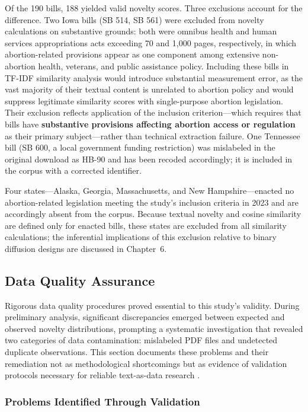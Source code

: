 Of the 190 bills, 188 yielded valid novelty scores. Three exclusions account for the difference. Two Iowa bills (SB 514, SB 561) were excluded from novelty calculations on substantive grounds: both were omnibus health and human services appropriations acts exceeding 70 and 1,000 pages, respectively, in which abortion-related provisions appear as one component among extensive non-abortion health, veterans, and public assistance policy. Including these bills in TF-IDF similarity analysis would introduce substantial measurement error, as the vast majority of their textual content is unrelated to abortion policy and would suppress legitimate similarity scores with single-purpose abortion legislation. Their exclusion reflects application of the inclusion criterion---which requires that bills have \textbf{substantive provisions affecting abortion access or regulation} as their primary subject---rather than technical extraction failure. One Tennessee bill (SB 600, a local government funding restriction) was mislabeled in the original download as HB-90 and has been recoded accordingly; it is included in the corpus with a corrected identifier.

Four states---Alaska, Georgia, Massachusetts, and New Hampshire---enacted no abortion-related legislation meeting the study's inclusion criteria in 2023 and are accordingly absent from the corpus. Because textual novelty and cosine similarity are defined only for enacted bills, these states are excluded from all similarity calculations; the inferential implications of this exclusion relative to binary diffusion designs are discussed in Chapter~6.

\subsection{Data Quality Assurance}
\label{sec:dataquality}
Rigorous data quality procedures proved essential to this study's validity. During preliminary analysis, significant discrepancies emerged between expected and observed novelty distributions, prompting a systematic investigation that revealed two categories of data contamination: mislabeled PDF files and undetected duplicate observations. This section documents these problems and their remediation not as methodological shortcomings but as evidence of validation protocols necessary for reliable text-as-data research \parencite{grimmerTextDataPromise2013}.

\subsubsection{Problems Identified Through Validation}

